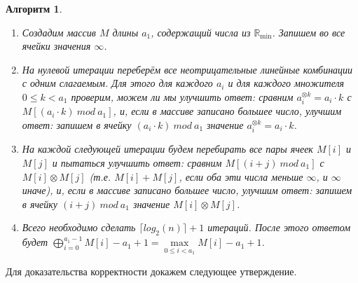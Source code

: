 \documentclass[12pt]{article}
\newtheorem{algorithm}[theorem]{Алгоритм}
\theoremstyle{definition}
\begin{document}
\begin{algorithm} { \ }
\label{algorithm}
\begin{enumerate}
	\item Создадим массив $M$ длины $a_1$, содержащий числа из $\mathbb{R}_{\min}$. Запишем во все ячейки значения $\infty$.
	
	\item На нулевой итерации переберём все неотрицательные линейные комбинации с одним слагаемым. Для этого для каждого $a_i$ и для каждого множителя $0 \le k < a_1$ проверим, можем ли мы улучшить ответ: сравним $a_i^{\otimes k} = a_i \cdot k$ с $M[(a_i \cdot k) \ mod \ a_1]$, и, если в массиве записано большее число, улучшим ответ: запишем в ячейку $(a_i \cdot k) \ mod \ a_1$ значение $a_i^{\otimes k} = a_i \cdot k$.
	
	\item На каждой следующей итерации будем перебирать все пары ячеек $M[i]$ и $M[j]$ и пытаться улучшить ответ: сравним $M[(i + j) \ mod \ a_1]$ с $M[i] \otimes M[j]$ (т.е. $M[i] + M[j]$, если оба эти числа меньше $\infty$, и $\infty$ иначе), и, если в массиве записано большее число, улучшим ответ: запишем в ячейку $(i + j) \ mod \ a_1$ значение $M[i] \otimes M[j]$.
	
	\item Всего необходимо сделать $\lceil log_2(n) \rceil + 1$ итераций. После этого ответом будет $\bigoplus \limits_{i = 0}^{a_1 - 1} M[i] - a_1 + 1 = \max\limits_{0 \le i < a_1} M[i] - a_1 + 1$.
\end{enumerate}
\end{algorithm}

Для доказательства корректности докажем следующее утверждение.
\end{document}
